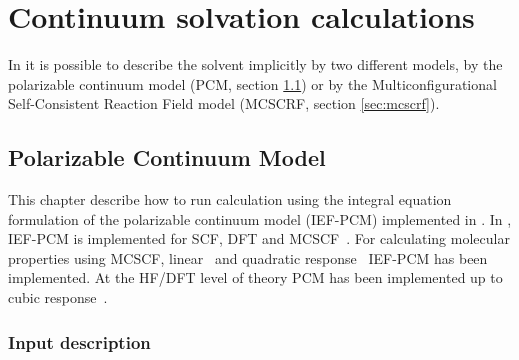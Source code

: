 \chapter{Continuum solvation calculations}\label{ch:solvent}

In {\dalton} it is possible to describe the solvent implicitly by two
different models, by the polarizable continuum model (PCM, section
\ref{sec:pcm}) or by the Multiconfigurational Self-Consistent Reaction
Field model (MCSCRF, section \ref{sec:mcscrf}).

\section{Polarizable Continuum Model}
\label{sec:pcm}

This chapter describe how to run calculation using the integral
equation formulation of the polarizable continuum model (IEF-PCM)
implemented in {\dalton}. In {\dalton}, IEF-PCM is
implemented for SCF, DFT and MCSCF~\cite{cammi02}. For calculating
molecular properties using MCSCF, linear~\cite{cammi03} and quadratic
response~\cite{frediani05} IEF-PCM has been implemented. At the HF/DFT
level of theory PCM has been implemented up to cubic
response~\cite{ferrighi07}.

\begin{center}
\end{center}

\subsection{Input description}\label{sec:pcminp}

